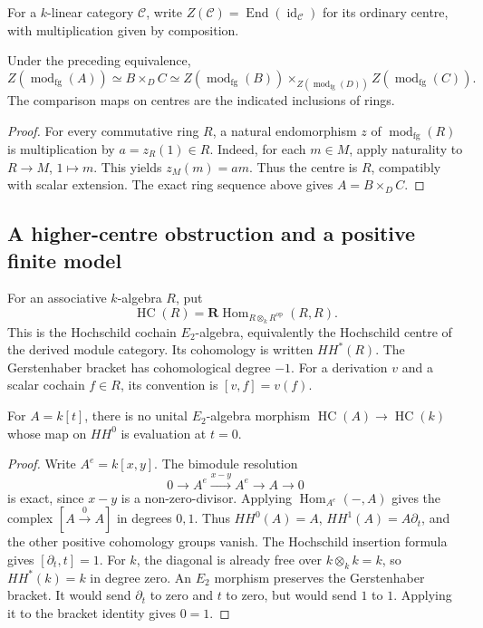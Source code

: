 For a $k$-linear category $\mathcal C$, write
$Z(\mathcal C)=\operatorname{End}(\operatorname{id}_{\mathcal C})$
for its ordinary centre, with multiplication given by composition.

\begin{corollary}
\label{v4-arith:w5-h:ordinary-patching-centre}
Under the preceding equivalence,
\[
 Z(\operatorname{mod}_{\mathrm{fg}}(A))
 \simeq B\times_D C
 \simeq Z(\operatorname{mod}_{\mathrm{fg}}(B))
       \times_{Z(\operatorname{mod}_{\mathrm{fg}}(D))}
       Z(\operatorname{mod}_{\mathrm{fg}}(C)).
\]
The comparison maps on centres are the indicated inclusions of rings.
\end{corollary}
\begin{proof}
For every commutative ring $R$, a natural endomorphism $z$ of
$\operatorname{mod}_{\mathrm{fg}}(R)$ is multiplication by
$a=z_R(1)\in R$. Indeed, for each $m\in M$, apply naturality to
$R\to M$, $1\mapsto m$. This yields $z_M(m)=am$.
Thus the centre is $R$, compatibly with scalar extension.
The exact ring sequence above gives $A=B\times_D C$.
\end{proof}

\subsection{A higher-centre obstruction and a positive finite model}

For an associative $k$-algebra $R$, put
\[
 \operatorname{HC}(R)=\mathbf R\operatorname{Hom}_{R\otimes_k R^{\mathrm{op}}}(R,R).
\]
This is the Hochschild cochain $E_2$-algebra, equivalently the
Hochschild centre of the derived module category.
Its cohomology is written $HH^*(R)$.
The Gerstenhaber bracket has cohomological degree $-1$.
For a derivation $v$ and a scalar cochain $f\in R$, its convention
is $[v,f]=v(f)$.

\begin{proposition}
\label{v4-arith:w5-h:hc-restriction-obstruction}
\label{v4-arith:w5-h:thm:gkrw-e2-centre}
For $A=k[t]$, there is no unital $E_2$-algebra morphism
$\operatorname{HC}(A)\to\operatorname{HC}(k)$ whose map on $HH^0$
is evaluation at $t=0$.
\end{proposition}
\begin{proof}
Write $A^e=k[x,y]$. The bimodule resolution
\[
 0\longrightarrow A^e\xrightarrow{x-y}A^e\longrightarrow A
 \longrightarrow0
\]
is exact, since $x-y$ is a non-zero-divisor.
Applying $\operatorname{Hom}_{A^e}(-,A)$ gives the complex
$[A\xrightarrow{0}A]$ in degrees $0,1$.
Thus $HH^0(A)=A$, $HH^1(A)=A\partial_t$, and the other positive
cohomology groups vanish. The Hochschild insertion formula gives
$[\partial_t,t]=1$.
For $k$, the diagonal is already free over $k\otimes_k k=k$,
so $HH^*(k)=k$ in degree zero.
An $E_2$ morphism preserves the Gerstenhaber bracket.
It would send $\partial_t$ to zero and $t$ to zero, but would send
$1$ to $1$. Applying it to the bracket identity gives $0=1$.
\end{proof}

